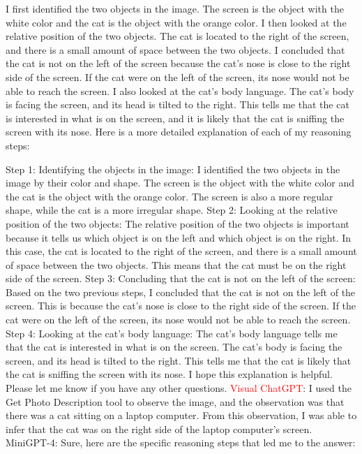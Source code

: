 \begin{enumerate}
        I first identified the two objects in the image. The screen is the object with the white color and the cat is the object with the orange color.
        I then looked at the relative position of the two objects. The cat is located to the right of the screen, and there is a small amount of space between the two objects.
        I concluded that the cat is not on the left of the screen because the cat's nose is close to the right side of the screen. If the cat were on the left of the screen, its nose would not be able to reach the screen.
        I also looked at the cat's body language. The cat's body is facing the screen, and its head is tilted to the right. This tells me that the cat is interested in what is on the screen, and it is likely that the cat is sniffing the screen with its nose.
        Here is a more detailed explanation of each of my reasoning steps:
        
        Step 1: Identifying the objects in the image: I identified the two objects in the image by their color and shape. The screen is the object with the white color and the cat is the object with the orange color. The screen is also a more regular shape, while the cat is a more irregular shape.
        Step 2: Looking at the relative position of the two objects: The relative position of the two objects is important because it tells us which object is on the left and which object is on the right. In this case, the cat is located to the right of the screen, and there is a small amount of space between the two objects. This means that the cat must be on the right side of the screen.
        Step 3: Concluding that the cat is not on the left of the screen: Based on the two previous steps, I concluded that the cat is not on the left of the screen. This is because the cat's nose is close to the right side of the screen. If the cat were on the left of the screen, its nose would not be able to reach the screen.
        Step 4: Looking at the cat's body language: The cat's body language tells me that the cat is interested in what is on the screen. The cat's body is facing the screen, and its head is tilted to the right. This tells me that the cat is likely that the cat is sniffing the screen with its nose.
        I hope this explanation is helpful. Please let me know if you have any other questions.
        \subitem \textcolor{red}{Visual ChatGPT}: I used the Get Photo Description tool to observe the image, and the observation was that there was a cat sitting on a laptop computer. From this observation, I was able to infer that the cat was on the right side of the laptop computer's screen.
        \subitem MiniGPT-4: Sure, here are the specific reasoning steps that led me to the answer:


\end{enumerate}
